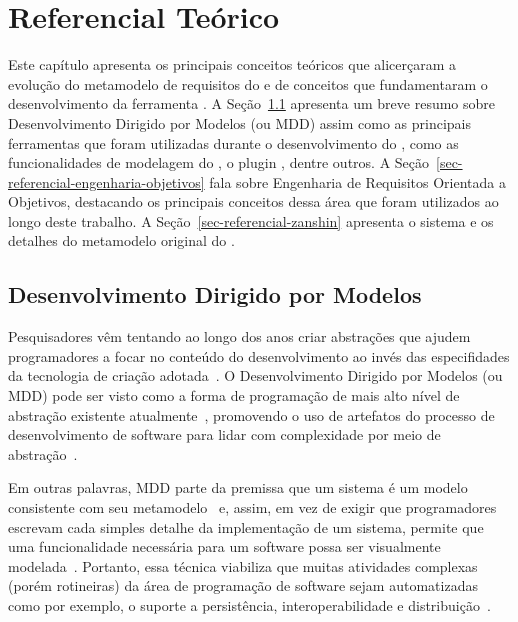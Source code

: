 \chapter{Referencial Teórico}
\label{sec-referencial}

Este capítulo apresenta os principais conceitos teóricos que alicerçaram a evolução do metamodelo de requisitos do \zanshin e de conceitos que fundamentaram o desenvolvimento da ferramenta \unagi. A Seção~\ref{referencial-mdd} apresenta um breve resumo sobre Desenvolvimento Dirigido por Modelos (\mdd ou MDD) assim como  as principais ferramentas que foram utilizadas durante o desenvolvimento do \unagi, como as funcionalidades \emf de modelagem do \eclipse, o plugin \sirius, dentre outros. A Seção~\ref{sec-referencial-engenharia-objetivos} fala sobre Engenharia de Requisitos Orientada a Objetivos, destacando os principais conceitos dessa área que foram utilizados ao longo deste trabalho. A Seção~\ref{sec-referencial-zanshin} apresenta o sistema \zanshin e os detalhes do metamodelo original do \framework. 

\section{Desenvolvimento Dirigido por Modelos}
\label{referencial-mdd}
Pesquisadores vêm tentando ao longo dos anos criar abstrações que ajudem programadores a focar no conteúdo do desenvolvimento ao invés das especifidades da tecnologia de criação adotada~\cite{viyovic2014sirius}. O Desenvolvimento Dirigido por Modelos (\mdd ou MDD) pode ser visto como a forma de programação de mais alto nível de abstração existente atualmente~\cite{atkinson2003model}, promovendo o uso de artefatos do processo de desenvolvimento de software para lidar com complexidade por meio de abstração~\cite{viyovic2014sirius}.

Em outras palavras, MDD parte da premissa que um sistema é um modelo consistente com seu metamodelo~\cite{vujovic2014comparative} e, assim, em vez de exigir que programadores escrevam cada simples detalhe da implementação de um sistema, permite que uma funcionalidade necessária para um software possa ser visualmente modelada~\cite{atkinson2003model}. Portanto, essa técnica viabiliza que muitas atividades complexas (porém rotineiras) da área de programação de software sejam automatizadas como por exemplo, o suporte a persistência, interoperabilidade e distribuição~\cite{atkinson2003model}.

